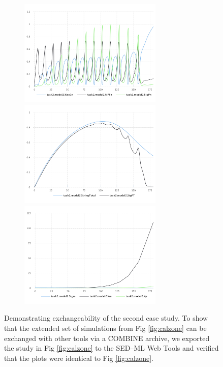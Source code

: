 \documentclass[10pt,letterpaper]{article}
\begin{document}
\begin{figure}
\begin{subfigure}{0.5\textwidth}
    \includegraphics[width=0.75\textwidth]{swt-calzone4.pdf}
    \includegraphics[width=0.75\textwidth]{swt-calzone5.pdf}
    \includegraphics[width=0.75\textwidth]{swt-calzone6.pdf}
  \end{subfigure}
  \caption{ Demonstrating exchangeability of the second case study. To show that the extended set of simulations from Fig \ref{fig:calzone} can be exchanged with other tools via a COMBINE archive, we exported the study in Fig \ref{fig:calzone} to the SED--ML Web Tools and verified that the plots were identical to Fig \ref{fig:calzone}. }
  \label{fig:swt-calzone}
\end{figure}
\end{document}

